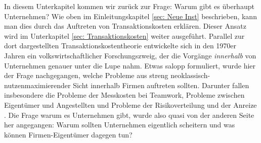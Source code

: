 In diesem Unterkapitel kommen wir zurück zur Frage: Warum gibt es überhaupt Unternehmen? Wie oben im Einleitungskapitel \ref{sec: Neue Inst} beschrieben, kann man dies durch das Auftreten von Transaktionskosten erklären. Dieser Ansatz wird im Unterkapitel \ref{sec: Transaktionskosten} weiter ausgeführt. Parallel zur dort dargestellten Transaktionskostentheorie entwickelte sich in den 1970er Jahren ein volkswirtschaftlicher Forschungszweig, der die Vorgänge \textit{innerhalb} von Unternehmen genauer unter die Lupe nahm.  Etwas salopp formuliert, wurde hier der Frage nachgegangen, welche Probleme aus streng neoklassisch-nutzenmaximierender Sicht innerhalb Firmen auftreten sollten. Darunter fallen insbesondere die Probleme der Messkosten bei Teamwork, Probleme zwischen Eigentümer und Angestellten und Probleme der Risikoverteilung und der Anreize \parencite[S. 67]{Erlei2016}. Die Frage warum es Unternehmen gibt, wurde also quasi von der anderen Seite her angegangen: Warum sollten Unternehmen eigentlich scheitern und was können Firmen-Eigentümer dagegen tun? 

